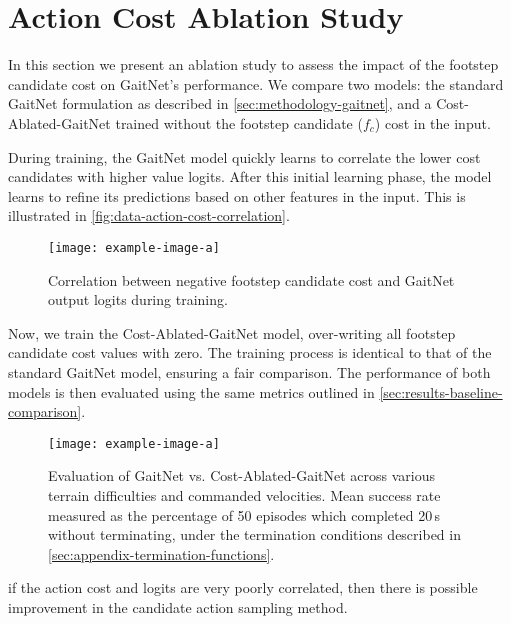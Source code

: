 \section{Action Cost Ablation Study}
\label{sec:results-action-cost-ablation-study}

In this section we present an ablation study to assess the impact of
the footstep candidate cost on GaitNet's performance. We compare two
models: the standard GaitNet formulation as described in
\autoref{sec:methodology-gaitnet}, and a Cost-Ablated-GaitNet trained without
the footstep candidate ($f_c$) cost in the input.

During training, the GaitNet model quickly learns to correlate the
lower cost candidates with higher value logits. After this initial
learning phase, the model learns to refine its predictions based on
other features in the input. This is illustrated in
\autoref{fig:data-action-cost-correlation}.

\begin{figure}[H]
  \centering
  \texttt{[image: example-image-a]}
  \caption{Correlation between negative footstep candidate cost and
  GaitNet output   logits during training.}
  \label{fig:data-action-cost-correlation}
\end{figure}

Now, we train the Cost-Ablated-GaitNet model, over-writing all
footstep candidate cost values with zero. The training process is
identical to that of the standard GaitNet model, ensuring a fair
comparison. The performance of both models is then evaluated using
the same metrics outlined in
\autoref{sec:results-baseline-comparison}.

\begin{figure}[H]
  \centering
  \texttt{[image: example-image-a]}
  \caption{Evaluation of GaitNet vs. Cost-Ablated-GaitNet
    across various terrain difficulties and commanded velocities.
    Mean success rate measured as the percentage of 50 episodes
    which completed 20\,s without terminating, under the termination
  conditions described in \autoref{sec:appendix-termination-functions}.}
  \label{fig:data-action-cost-ablation-comparison}
\end{figure}

\begin{todo}
  if the action cost and logits are very poorly correlated, then
  there is   possible improvement in the candidate action sampling method.
\end{todo}

